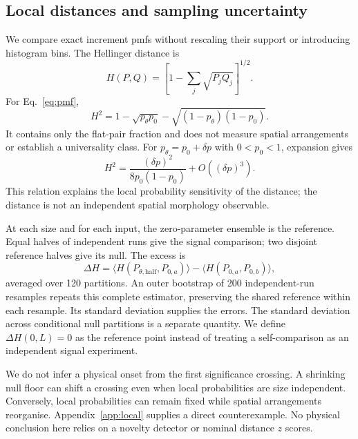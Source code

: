\subsection{Local distances and sampling uncertainty}
We compare exact increment pmfs without rescaling their support or introducing
histogram bins. The Hellinger distance is
\cite{Hellinger1909,Bhattacharyya1943}
\begin{equation}
 H(P,Q)=\left[1-\sum_j\sqrt{P_jQ_j}\right]^{1/2}.
 \label{eq:H}
\end{equation}
For Eq.~\eqref{eq:pmf},
\begin{equation}
 H^2=1-\sqrt{p_\theta p_0}-\sqrt{(1-p_\theta)(1-p_0)}.
 \label{eq:localH}
\end{equation}
It contains only the flat-pair fraction and does not measure spatial
arrangements or establish a universality class.
For $p_\theta=p_0+\delta p$ with $0<p_0<1$, expansion gives
\begin{equation}
 H^2=\frac{(\delta p)^2}{8p_0(1-p_0)}+O((\delta p)^3).
 \label{eq:Hexpansion}
\end{equation}
This relation explains the local probability sensitivity of the distance;
the distance is not an independent spatial morphology observable.

At each size and for each input, the zero-parameter ensemble is the reference.
Equal halves of independent runs give the signal comparison; two disjoint
reference halves give its null. The excess is
\begin{equation}
 \Delta H=\langle H(P_{\theta,\mathrm{half}},P_{0,a})\rangle
             -\langle H(P_{0,a},P_{0,b})\rangle,
 \label{eq:excess}
\end{equation}
averaged over 120 partitions. An outer bootstrap of 200 independent-run
resamples repeats this complete estimator, preserving the shared reference
within each resample. Its standard deviation supplies the errors. The
standard deviation across conditional null partitions is a separate quantity.
We define $\Delta H(0,L)=0$ as the reference point instead of treating a
self-comparison as an independent signal experiment.

We do not infer a physical onset from the first significance crossing. A
shrinking null floor can shift a crossing even when local probabilities are
size independent. Conversely, local probabilities can remain fixed while
spatial arrangements reorganise. Appendix~\ref{app:local} supplies a direct
counterexample. No physical conclusion here relies on a novelty detector or
nominal distance $z$ scores.

